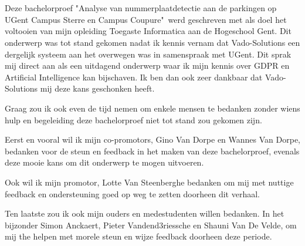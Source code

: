 
\chapter*{}
\label{ch:voorwoord}


Deze bachelorproef "Analyse van nummerplaatdetectie aan de parkingen op UGent Campus Sterre en Campus Coupure"\ werd geschreven met als doel het voltooien van mijn opleiding Toegaste Informatica aan de Hogeschool Gent. Dit onderwerp was tot stand gekomen nadat ik kennis vernam dat Vado-Solutions een dergelijk systeem aan het overwegen was in samenspraak met UGent. Dit sprak mij direct aan als een uitdagend onderwerp waar ik mijn kennis over GDPR en Artificial Intelligence kan bijschaven. Ik ben dan ook zeer dankbaar dat Vado-Solutions mij deze kans geschonken heeft.

Graag zou ik ook even de tijd nemen om enkele mensen te bedanken zonder wiens hulp en begeleiding deze bachelorproef niet tot stand zou gekomen zijn.

Eerst en vooral wil ik mijn co-promotors, Gino Van Dorpe en Wannes Van Dorpe, bedanken voor de steun en feedback in het maken van deze bachelorproef, evenals deze mooie kans om dit onderwerp te mogen uitvoeren.

Ook wil ik mijn promotor, Lotte Van Steenberghe bedanken om mij met nuttige feedback en ondersteuning goed op weg te zetten doorheen dit verhaal.

Ten laatste zou ik ook mijn ouders en medestudenten willen bedanken. In het bijzonder Simon Anckaert, Pieter Vandend3riessche en Shauni Van De Velde, om mij the helpen met morele steun en wijze feedback doorheen deze periode.